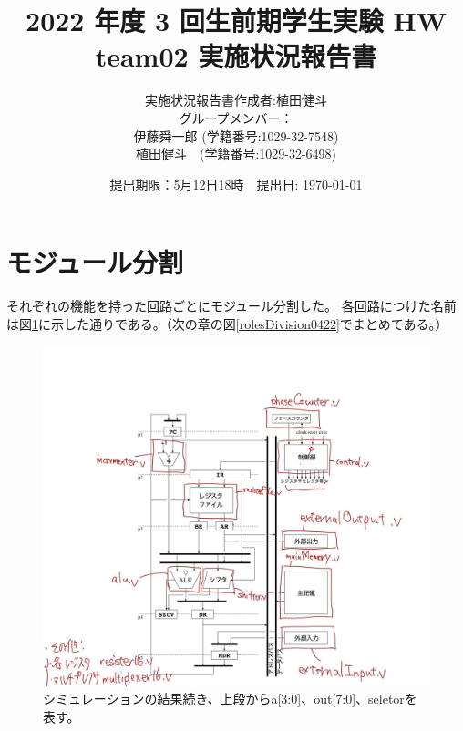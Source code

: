 \documentclass[a4j,titlepage]{jarticle}
\begin{document}
\title{2022 年度 3 回生前期学生実験 HW  \\ \bf team02 実施状況報告書}
\author{実施状況報告書作成者:植田健斗\\
グループメンバー：\\伊藤舜一郎 (学籍番号:1029-32-7548)
\\植田健斗　(学籍番号:1029-32-6498)}
\date{提出期限：5月12日18時　提出日: \today} %
\maketitle
\newpage

\section{モジュール分割}

それぞれの機能を持った回路ごとにモジュール分割した。
各回路につけた名前は図\ref{moduleSplit0422}に示した通りである。（次の章の図\ref{rolesDivision0422}でまとめてある。）


\begin{figure}[H]
    \begin{center}
    \includegraphics[scale = 0.22]{moduleSplit0422.jpg}
    \end{center}
    \caption{シミュレーションの結果続き、上段からa[3:0]、out[7:0]、seletorを表す。}
    \label{moduleSplit0422}
\end{figure}
\end{document}
